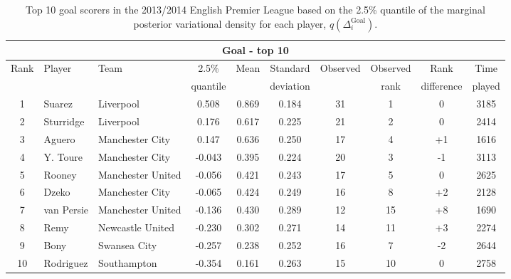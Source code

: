 \documentclass[11pt,a4paper]{article}
\begin{document}
\begin{table}[t] 
\caption{Top 10 goal scorers in the 2013/2014 English Premier League based on the 2.5\% quantile of the marginal posterior variational density for each player, $q(\Delta_i^{\textrm{Goal}})$.} \label{tablegoal}
\centering
\footnotesize
\begin{tabular}{cllccccccc}
\hline
\multicolumn{10}{c}{Goal - top 10}\\
\hline
\multirow{2}{*}{Rank} & \multirow{2}{*}{Player} &  \multirow{2}{*}{Team} & 2.5\% & \multirow{2}{*}{Mean} & Standard & \multirow{2}{*}{Observed} & Observed & Rank & Time\\
 &  &  & quantile & & deviation &  & rank & difference & played \\
\hline
1 &  Suarez 	& Liverpool	& 0.508 & 0.869 &	0.184	& 31	& 1 & 0  & 3185\\ 
2 &  Sturridge & Liverpool	& 0.176 & 0.617 &	0.225  	& 21	& 2 & 0  & 2414\\
3 &  Aguero 	& Manchester City	& 0.147 & 0.636 &	0.250	& 17	& 4 & +1  & 1616\\
4 & Y. Toure 	& Manchester City	& -0.043 & 0.395 &	0.224	& 20	& 3 & -1  & 3113\\
5 & Rooney 	& Manchester United	& -0.056 & 0.421 &	0.243	& 17	& 5 & 0  & 2625\\
6 & Dzeko 	&	Manchester City & -0.065 & 0.424 &	0.249 		& 16	& 8 & +2  & 2128\\
7 & van Persie & Manchester United	& -0.136 & 0.430 &	0.289 	& 12	& 15 & +8  & 1690 \\
8 & Remy 	& Newcastle United	& -0.230 & 0.302 &	0.271 	& 14	& 11 & +3  & 2274\\
9 & Bony 	& Swansea City	& -0.257 & 0.238 &	0.252 	& 16	& 7 & -2  & 2644\\
10 & Rodriguez 	& Southampton	& -0.354 & 0.161 &	0.263 	& 15	& 10 	& 0  & 2758\\
\hline
\end{tabular}
\end{table}
\end{document}
